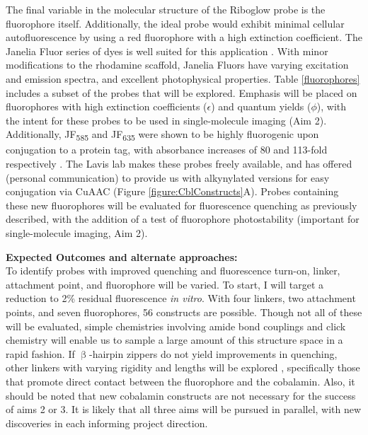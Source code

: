 The final variable in the molecular structure of the Riboglow probe is the fluorophore itself.  Additionally, the ideal probe would exhibit minimal cellular autofluorescence by using a red fluorophore with a high extinction coefficient. The Janelia Fluor series of dyes is well suited for this application \cite{Grimmgeneralmethodfinetune2017,Grimmgeneralmethodimprove2015}. With minor modifications to the rhodamine scaffold, Janelia Fluors have varying excitation and emission spectra, and excellent photophysical properties.
Table \ref{fluorophores} includes a subset of the probes that will be explored.
Emphasis will be placed on fluorophores with high extinction coefficients ($\epsilon$) and quantum yields ($\phi$), with the intent for these probes to be used in single-molecule imaging (Aim 2).
Additionally, JF\textsubscript{585} and JF\textsubscript{635} were shown to be highly fluorogenic upon conjugation to a protein tag, with absorbance increases of 80 and 113-fold respectively \cite{Grimmgeneralmethodfinetune2017}.
The Lavis lab makes these probes freely available, and has offered (personal communication) to provide us with alkynylated versions for easy conjugation via CuAAC (Figure \ref{figure:CblConstructs}A).
Probes containing these new fluorophores will be evaluated for fluorescence quenching as previously described, with the addition of a test of fluorophore photostability (important for single-molecule imaging, Aim 2).

\textbf{Expected Outcomes and alternate approaches:}\\
To identify probes with improved quenching and fluorescence turn-on, linker, attachment point, and fluorophore will be varied. To start, I will target a reduction to 2\% residual fluorescence \textit{in vitro}. With four linkers, two attachment points, and seven fluorophores, 56 constructs are possible. Though not all of these will be evaluated, simple chemistries involving amide bond couplings and click chemistry will enable us to sample a large amount of this structure space in a rapid fashion. If $\upbeta$-hairpin zippers do not yield improvements in quenching, other linkers with varying rigidity and lengths will be explored \cite{LeeDesignSynthesisCharacterization2009}, specifically those that promote direct contact between the fluorophore and the cobalamin. Also, it should be noted that new cobalamin constructs are not necessary for the success of aims 2 or 3. It is likely that all three aims will be pursued in parallel, with new discoveries in each informing project direction.

